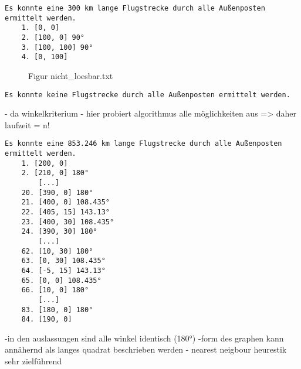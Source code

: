 \documentclass[a4paper,10pt,ngerman]{scrartcl}
\begin{document}
    \begin{lstlisting}[frame=single, title=Programmausgabe viereck.txt, breaklines=true,label={lst:lstlisting3}]
    Es konnte eine 300 km lange Flugstrecke durch alle Außenposten ermittelt werden.
    1. [0, 0]
    2. [100, 0] 90°
    3. [100, 100] 90°
    4. [0, 100]
    \end{lstlisting}

    \begin{figure}[H]
        \centering
        \caption{Figur nicht\_loesbar.txt}
        \label{fig:Figure4}
    \end{figure}

    \begin{lstlisting}[frame=single, title=Programmausgabe nicht\_loesbar.txt, breaklines=true,label={lst:lstlisting4}]
    Es konnte keine Flugstrecke durch alle Außenposten ermittelt werden.
    \end{lstlisting}

    - da winkelkriterium
    - hier probiert algorithmus alle möglichkeiten aus
    => daher laufzeit = n!


    \begin{lstlisting}[frame=single, title=Programmausgabe wenigerkrumm1.txt, breaklines=true,label={lst:lstlisting4}]
    Es konnte eine 853.246 km lange Flugstrecke durch alle Außenposten ermittelt werden.
    1. [200, 0]
    2. [210, 0] 180°
        [...]
    20. [390, 0] 180°
    21. [400, 0] 108.435°
    22. [405, 15] 143.13°
    23. [400, 30] 108.435°
    24. [390, 30] 180°
        [...]
    62. [10, 30] 180°
    63. [0, 30] 108.435°
    64. [-5, 15] 143.13°
    65. [0, 0] 108.435°
    66. [10, 0] 180°
        [...]
    83. [180, 0] 180°
    84. [190, 0]
    \end{lstlisting}

    -in den auslassungen sind alle winkel identisch (180°)
    -form des graphen kann annähernd als langes quadrat beschrieben werden
    - nearest neigbour heurestik sehr zielführend
\end{document}
